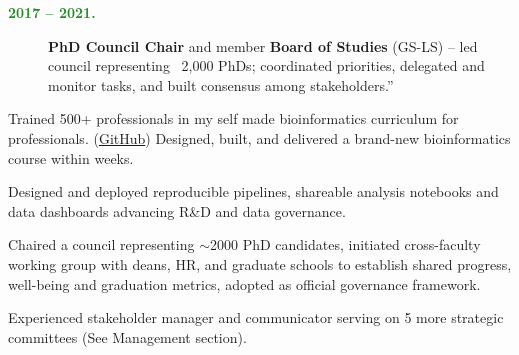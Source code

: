 \documentclass[a4paper,10pt]{article}
\begin{document}
{\begin{adjustbox}{valign=t}
\begin{minipage}[t]{0.6\textwidth}
\begin{description}
  \item[\normalfont \textcolor{ForestGreen}{\textbf{2017 -- 2021.}}] \textbf{PhD Council Chair} 
    and member \textbf{Board of Studies} (GS-LS) 
      -- led council representing ~2,000 PhDs; coordinated priorities, delegated and monitor tasks, 
      and built consensus among stakeholders.”
\end{description}


\begin{description}
  \item Trained 500+ professionals in my self made bioinformatics curriculum for professionals. 
    (\href{https://github.com/lauralwd/professional_education}{GitHub})
  Designed, built, and delivered a brand-new bioinformatics course within weeks.%
  \item Designed and deployed reproducible pipelines, shareable analysis notebooks and data dashboards advancing R\&D  and data governance. 
  \item Chaired a council representing $\sim$2000 PhD candidates,
    initiated cross-faculty working group with deans, HR, and graduate schools to establish shared progress, well-being and graduation metrics, 
    adopted as official governance framework.
  \item Experienced stakeholder manager and communicator serving on 5 more strategic committees
    (See Management section).

\end{description}
\end{minipage}
\end{adjustbox}}
\end{document}

